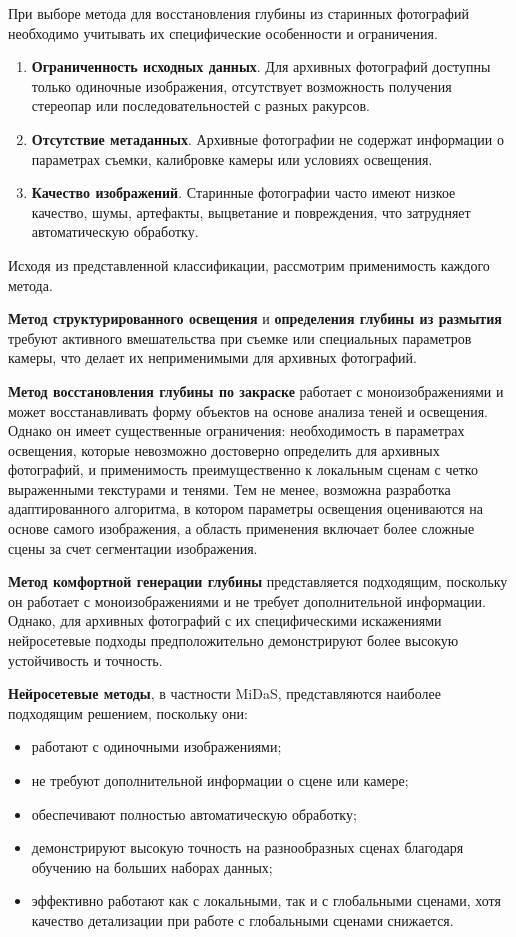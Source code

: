 При выборе метода для восстановления глубины из старинных фотографий необходимо учитывать их специфические особенности и ограничения.

\begin{enumerate}
    \item \textbf{Ограниченность исходных данных}. Для архивных фотографий доступны только одиночные изображения, отсутствует возможность получения стереопар или последовательностей с разных ракурсов.

    \item \textbf{Отсутствие метаданных}. Архивные фотографии не содержат информации о параметрах съемки, калибровке камеры или условиях освещения.

    \item \textbf{Качество изображений}. Старинные фотографии часто имеют низкое качество, шумы, артефакты, выцветание и повреждения, что затрудняет автоматическую обработку.
\end{enumerate}

Исходя из представленной классификации, рассмотрим применимость каждого метода.

\textbf{Метод структурированного освещения} и \textbf{определения глубины из размытия} требуют активного вмешательства при съемке или специальных параметров камеры, что делает их неприменимыми для архивных фотографий.

\textbf{Метод восстановления глубины по закраске} работает с моноизображениями и может восстанавливать форму объектов на основе анализа теней и освещения.
Однако он имеет существенные ограничения: необходимость в параметрах освещения, которые невозможно достоверно определить для архивных фотографий, и применимость преимущественно к локальным сценам с четко выраженными текстурами и тенями.
Тем не менее, возможна разработка адаптированного алгоритма, в котором параметры освещения оцениваются на основе самого изображения, а область применения включает более сложные сцены за счет сегментации изображения.

\textbf{Метод комфортной генерации глубины} представляется подходящим, поскольку он работает с моноизображениями и не требует дополнительной информации.
Однако, для архивных фотографий с их специфическими искажениями нейросетевые подходы предположительно демонстрируют более высокую устойчивость и точность.

\textbf{Нейросетевые методы}, в частности MiDaS, представляются наиболее подходящим решением, поскольку они:
\begin{itemize}
    \item работают с одиночными изображениями;
    \item не требуют дополнительной информации о сцене или камере;
    \item обеспечивают полностью автоматическую обработку;
    \item демонстрируют высокую точность на разнообразных сценах благодаря обучению на больших наборах данных;
    \item эффективно работают как с локальными, так и с глобальными сценами, хотя качество детализации при работе с глобальными сценами снижается.
\end{itemize}

